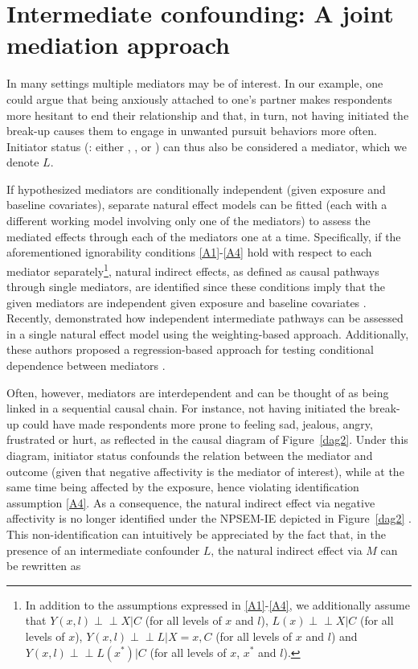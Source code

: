 \documentclass[nojss]{jss}
\newcommand{\cip}{\mbox{$\perp\!\!\!\perp$}}
\begin{document}
\section{Intermediate confounding: A joint mediation approach}\label{multmed}
In many settings multiple mediators may be of interest. In our example, one could argue that being anxiously attached to one's partner makes respondents more hesitant to end their relationship and that, in turn, not having initiated the break-up causes them to engage in unwanted pursuit behaviors more often. Initiator status (: either , , or ) can thus also be considered a mediator, which we denote $L$.
\par If hypothesized mediators are conditionally independent (given exposure and baseline covariates), separate natural effect models can be fitted (each with a different working model involving only one of the mediators) to assess the mediated effects through each of the mediators one at a time. Specifically, if the aforementioned ignorability conditions \ref{A1}-\ref{A4} hold with respect to each mediator separately\footnote{In addition to the assumptions expressed in \ref{A1}-\ref{A4}, we additionally assume that $Y(x,l) \cip X \vert C$ (for all levels of $x$ and $l$), $L(x) \cip X \vert C$ (for all levels of $x$), $Y(x,l) \cip L \vert X=x,C$ (for all levels of $x$ and $l$) and $Y(x,l) \cip L(x^*) \vert C$ (for all levels of $x$, $x^*$ and $l$).}, natural indirect effects, as defined as causal pathways through single mediators, are identified since these conditions imply that the given mediators are independent given exposure and baseline covariates \citep{Imai2013, VanderWeele2013b}. Recently, \cite{Lange2013a} demonstrated how independent intermediate pathways can be assessed in a single natural effect model using the weighting-based approach. Additionally, these authors proposed a regression-based approach for testing conditional dependence between mediators \citep[also see][]{Loeys2013a, Imai2013}.
\par Often, however, mediators are interdependent and can be thought of as being linked in a sequential causal chain. For instance, not having initiated the break-up could have made respondents more prone to feeling sad, jealous, angry, frustrated or hurt, as reflected in the causal diagram of Figure~\ref{dag2}. Under this diagram, initiator status confounds the relation between the mediator and outcome (given that negative affectivity is the mediator of interest), while at the same time being affected by the exposure, hence violating identification assumption \ref{A4}. As a consequence, the natural indirect effect via negative affectivity is no longer identified under the NPSEM-IE depicted in Figure~\ref{dag2} \citep[although see][for additional (parametric) restrictions which enable identification]{Robins2003, TchetgenTchetgen2014a,Vansteelandt2012d}. This non-identification can intuitively be appreciated by the fact that, in the presence of an intermediate confounder $L$, the natural indirect effect via $M$ can be rewritten as 
\end{document}
